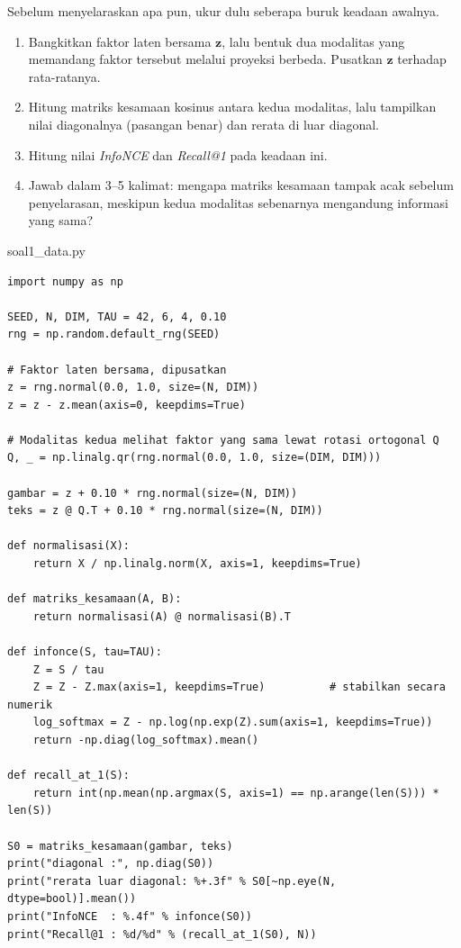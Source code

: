 \documentclass[12pt, a4paper]{article}
\begin{document}
Sebelum menyelaraskan apa pun, ukur dulu seberapa buruk keadaan awalnya.

\begin{enumerate}
  \item Bangkitkan faktor laten bersama $\mathbf{z}$, lalu bentuk dua modalitas yang
        memandang faktor tersebut melalui proyeksi berbeda. Pusatkan $\mathbf{z}$
        terhadap rata-ratanya.
  \item Hitung matriks kesamaan kosinus antara kedua modalitas, lalu tampilkan nilai
        diagonalnya (pasangan benar) dan rerata di luar diagonal.
  \item Hitung nilai \emph{InfoNCE} dan \emph{Recall@1} pada keadaan ini.
  \item Jawab dalam 3--5 kalimat: mengapa matriks kesamaan tampak acak sebelum
        penyelarasan, meskipun kedua modalitas sebenarnya mengandung informasi yang sama?
\end{enumerate}

\begin{codewindow}{soal1\_data.py}
\begin{lstlisting}[style=pycode]
import numpy as np

SEED, N, DIM, TAU = 42, 6, 4, 0.10
rng = np.random.default_rng(SEED)

# Faktor laten bersama, dipusatkan
z = rng.normal(0.0, 1.0, size=(N, DIM))
z = z - z.mean(axis=0, keepdims=True)

# Modalitas kedua melihat faktor yang sama lewat rotasi ortogonal Q
Q, _ = np.linalg.qr(rng.normal(0.0, 1.0, size=(DIM, DIM)))

gambar = z + 0.10 * rng.normal(size=(N, DIM))
teks = z @ Q.T + 0.10 * rng.normal(size=(N, DIM))

def normalisasi(X):
    return X / np.linalg.norm(X, axis=1, keepdims=True)

def matriks_kesamaan(A, B):
    return normalisasi(A) @ normalisasi(B).T

def infonce(S, tau=TAU):
    Z = S / tau
    Z = Z - Z.max(axis=1, keepdims=True)          # stabilkan secara numerik
    log_softmax = Z - np.log(np.exp(Z).sum(axis=1, keepdims=True))
    return -np.diag(log_softmax).mean()

def recall_at_1(S):
    return int(np.mean(np.argmax(S, axis=1) == np.arange(len(S))) * len(S))

S0 = matriks_kesamaan(gambar, teks)
print("diagonal :", np.diag(S0))
print("rerata luar diagonal: %+.3f" % S0[~np.eye(N, dtype=bool)].mean())
print("InfoNCE  : %.4f" % infonce(S0))
print("Recall@1 : %d/%d" % (recall_at_1(S0), N))
\end{lstlisting}
\end{codewindow}
\end{document}
